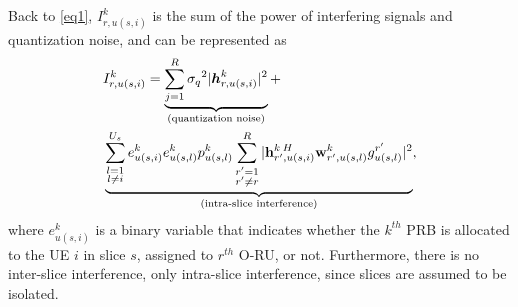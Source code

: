 \documentclass[lettersize,journal]{IEEEtran}
\begin{document}
Back to \eqref{eq1}, $I_{r,u(s,i)}^{k}$ is the sum of the power of interfering signals and quantization noise, and can be represented as 
\begin{align}\label{eqI}
&I_{r,u(s,i)}^{k} =\underbrace{  \sum_{j=1}^{{R}} {\sigma_q}^2 |\boldsymbol{h}_{r,{u(s,i)}}^k|^2 }_{\text{(quantization noise)}} + \nonumber\\
 &\underbrace{\sum_{\substack{l=1 \\ l\neq i}}^{{U}_{s}} e^{k}_{u(s,i)}e^{k}_{u(s,l)}  p_{u(s,l)}^{k}\sum_{\substack{r'=1 \\ r'\neq r}}^{R}|{\bold{h}_{r',u(s,i)}^{k \: H}} \bold{w}_{r',u(s,l)}^{k} g_{u(s,l)}^{r'}|^2}_{\text{(intra-slice interference)}},
\end{align}
where $e^{k}_{u(s,i)}$ is a binary variable that indicates whether the $k^{th}$ PRB is allocated to the UE $i$ in slice $s$, assigned to $r^{th}$ O-RU, or not. %
Furthermore, there is no inter-slice interference, only intra-slice interference, since slices are assumed to be isolated. 
\end{document}
